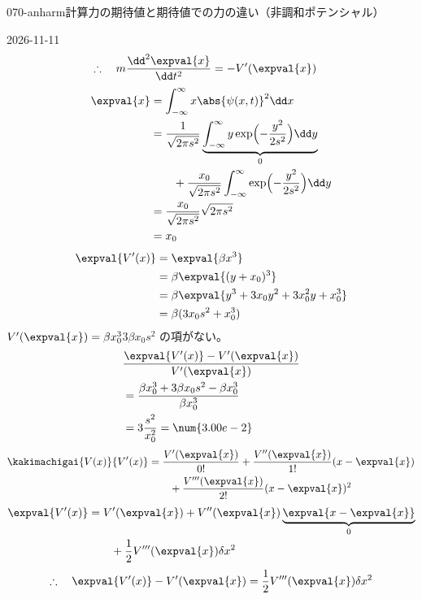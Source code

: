 \documentclass[uplatex,dvipdfmx,a4paper,11pt]{jsarticle}
\begin{document}
\begin{mondai}{070-anharm}{計算}{力の期待値と期待値での力の違い（非調和ポテンシャル）}
\begin{kotaeutsushi}{2026-11-11}
\begin{align*}
\therefore\quad m\frac{\dd^{2}\expval{x}}{\dd t^{2}}&=-V'(\expval{x})
\end{align*}
\begin{align*}
\expval{x}&=\int_{-\infty}^{\infty}x\abs{\psi(x,t)}^{2}\dd x\\
&=\frac{1}{\sqrt{2\pi s^{2}}}\underbrace{\int_{-\infty}^{\infty}y\exp\Bigl(-\frac{y^{2}}{2s^{2}}\Bigr)\dd y}_{0}\\
&\qquad+\frac{x_{0}}{\sqrt{2\pi s^{2}}}\int_{-\infty}^{\infty}\exp\Bigl(-\frac{y^{2}}{2s^{2}}\Bigr)\dd y\\
&=\frac{x_{0}}{\sqrt{2\pi s^{2}}}\sqrt{2\pi s^{2}}\\
&=x_{0}
\end{align*}
\begin{align*}
\expval{V'(x)}&=\expval{\beta x^{3}}\\
&=\beta\expval{(y+x_{0})^{3}}\\
&=\beta\expval{y^{3}+3x_{0}y^{2}+3x_{0}^{2}y+x_{0}^{3}}\\
&=\beta(3x_{0}s^{2}+x_{0}^{3})
\end{align*}
$V'(\expval{x})=\beta x_{0}^{3}$\quad $3\beta x_{0}s^{2}$ の項がない。
\begin{align*}
&\frac{\expval{V'(x)}-V'(\expval{x})}{V'(\expval{x})}\\
&=\frac{\beta x_{0}^{3}+3\beta x_{0}s^{2}-\beta x_{0}^{3}}{\beta x_{0}^{3}}\\
&=3\frac{s^{2}}{x_{0}^{2}}=\num{3.00e-2}
\end{align*}
\begin{align*}
\kakimachigai{V(x)}{V'(x)}&=\frac{V'(\expval{x})}{0!}+\frac{V''(\expval{x})}{1!}(x-\expval{x})\\
&\qquad+\frac{V'''(\expval{x})}{2!}(x-\expval{x})^{2}
\end{align*}
\begin{align*}
\expval{V'(x)}&=V'(\expval{x})+V''(\expval{x})\underbrace{\expval{x-\expval{x}}}_{0}\\
&\qquad+\frac{1}{2}V'''(\expval{x})\delta x^{2}
\end{align*}
\[ \therefore\quad\expval{V'(x)}-V'(\expval{x})=\frac{1}{2}V'''(\expval{x})\delta x^{2} \]

\end{kotaeutsushi}
\end{mondai}
\end{document}
